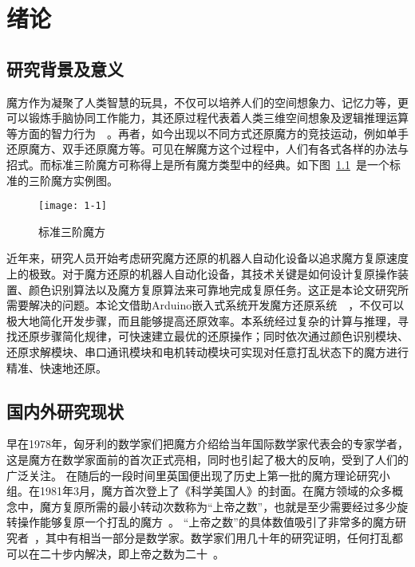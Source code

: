 
\chapter{绪论}
\section{研究背景及意义}

魔方作为凝聚了人类智慧的玩具，不仅可以培养人们的空间想象力、记忆力等，更可以锻炼手脑协同工作能力，其还原过程代表着人类三维空间想象及逻辑推理运算等方面的智力行为~\cite{1}~\cite{2}。再者，如今出现以不同方式还原魔方的竞技运动，例如单手还原魔方、双手还原魔方等。可见在解魔方这个过程中，人们有各式各样的办法与招式。而标准三阶魔方可称得上是所有魔方类型中的经典。如下图~\ref{fig:1-1}~是一个标准的三阶魔方实例图。

\begin{figure}[H]
	\centering
	\texttt{[image: 1-1]}
	\caption{标准三阶魔方}\label{fig:1-1}
\end{figure}

近年来，研究人员开始考虑研究魔方还原的机器人自动化设备以追求魔方复原速度上的极致。对于魔方还原的机器人自动化设备，其技术关键是如何设计复原操作装置、颜色识别算法以及魔方复原算法来可靠地完成复原任务。这正是本论文研究所需要解决的问题。本论文借助Arduino嵌入式系统开发魔方还原系统~\cite{3}~\cite{4}，不仅可以极大地简化开发步骤，而且能够提高还原效率。本系统经过复杂的计算与推理，寻找还原步骤简化规律，可快速建立最优的还原操作；同时依次通过颜色识别模块、还原求解模块、串口通讯模块和电机转动模块可实现对任意打乱状态下的魔方进行精准、快速地还原。

\section{国内外研究现状}

早在1978年，匈牙利的数学家们把魔方介绍给当年国际数学家代表会的专家学者，这是魔方在数学家面前的首次正式亮相，同时也引起了极大的反响，受到了人们的广泛关注。
在随后的一段时间里英国便出现了历史上第一批的魔方理论研究小组。在1981年3月，魔方首次登上了《科学美国人》的封面。在魔方领域的众多概念中，魔方复原所需的最小转动次数称为“上帝之数”，也就是至少需要经过多少旋转操作能够复原一个打乱的魔方~\cite{1}。
“上帝之数”的具体数值吸引了非常多的魔方研究者~\cite{5}，其中有相当一部分是数学家。数学家们用几十年的研究证明，任何打乱都可以在二十步内解决，即上帝之数为二十~\cite{6}。

